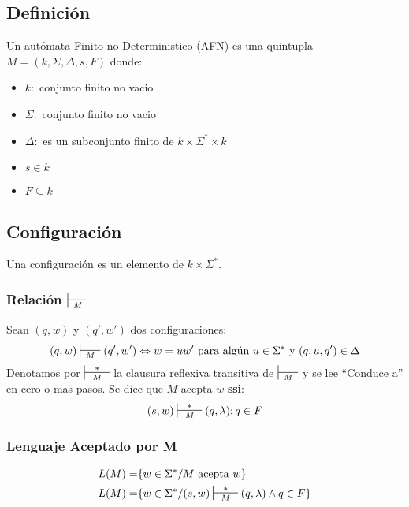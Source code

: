 \subsection{Definición}
Un autómata Finito no Deterministico (AFN) es una quintupla $M=(k,\Sigma,\Delta,s,F)$ donde:
\begin{itemize}
\item $k:$ conjunto finito no vacio
\item $\Sigma:$ conjunto finito no vacio
\item $\Delta:$ es un subconjunto finito de $k\times\Sigma^* \times k$
\item $s\in k$
\item $F\subseteq k$
\end{itemize}
\subsection{Configuración}
Una configuración es un elemento de $k\times \Sigma^*$.

\subsubsection{Relación $\sststile{M}{\hspace{0.25cm}  \hspace{0.25cm}}$}
Sean $(q,w)$ y $(q',w')$ dos configuraciones:
$$
	(q,w) \sststile{M}{\hspace{0.25cm}  \hspace{0.25cm}} (q',w') \Leftrightarrow w = uw' \text{ para algún } u \in\Sigma^* \text{ y } (q,u,q')\in\Delta
$$
Denotamos por $\sststile{M}{\hspace{0.25cm} * \hspace{0.25cm}}$ la clausura reflexiva transitiva de $\sststile{M}{\hspace{0.25cm}  \hspace{0.25cm}}$ y se lee ``Conduce a'' en cero o mas pasos. Se dice que $M$ acepta $w$ \textbf{ssi}:
$$
	(s,w) \sststile{M}{\hspace{0.25cm} * \hspace{0.25cm}} (q,\lambda ); q\in F
$$
\subsubsection{Lenguaje Aceptado por M}
\begin{align*}
L(M) = & \{ w\in\Sigma^* / M \text{ acepta } w\} \\
L(M) = & \{ w\in\Sigma^* / (s,w) \sststile{M}{\hspace{0.25cm} * \hspace{0.25cm}} (q,\lambda) \wedge q\in F\}
\end{align*}
